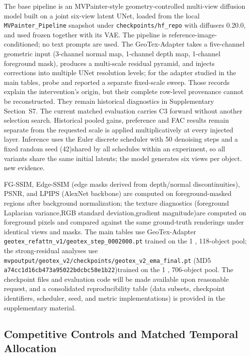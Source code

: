 \documentclass[times,twocolumn,final]{elsarticle}
\providecommand{\DIFadd}[1]{{\protect\color{blue} \sf #1}} %
\providecommand{\DIFdel}[1]{{\protect\color{red} \scriptsize #1}} %
\providecommand{\DIFaddbegin}{} %
\providecommand{\DIFaddend}{} %
\providecommand{\DIFdelbegin}{} %
\providecommand{\DIFdelend}{} %
\begin{document}
\DIFdel{The base pipeline is an MVPainter-style geometry-controlled multi-view diffusion model built on a joint six-view latent UNet, loaded from the local \texttt{MVPainter\_Pipeline} snapshot under \texttt{checkpoints/hf\_repo} with diffusers 0.20.0, and used frozen together with its VAE. The pipeline is reference-image-conditioned; no text prompts are used. The GeoTex-Adapter takes a five-channel geometric input (3-channel normal map, 1-channel depth map, 1-channel foreground mask), produces a multi-scale residual pyramid, and injects corrections into multiple UNet resolution levels; for the adapter studied in the main tables, }\DIFdelend \DIFaddbegin \DIFadd{probe and reported a separate fixed-scale sweep. Those records explain the intervention's origin, but their complete row-level provenance cannot be reconstructed. They remain historical diagnostics in Supplementary Section~S7. The current matched evaluation carries C3 forward without another selection search. Historical pooled gains, preference and FAC results remain separate from }\DIFaddend the \DIFdelbegin \DIFdel{requested scale is applied multiplicatively at every injected layer. Inference uses the Euler discrete scheduler with 50 denoising steps and a fixed random seed (42)shared by all schedules within an experiment, so all variants share the same initial latents; the model generates six views per object.
}\DIFdelend \DIFaddbegin \DIFadd{new evidence.
}\DIFaddend 

\DIFdelbegin \DIFdel{FG-SSIM, Edge-SSIM (edge masks derived from depth/normal discontinuities), PSNR, and LPIPS (AlexNet backbone) are computed on foreground-masked regions after background normalization; the texture diagnostics (foreground Laplacian variance,RGB standard deviation,gradient magnitude)are computed on foreground pixels and compared against the same ground-truth renderings under identical views and masks. The main tables use GeoTex-Adapter \texttt{geotex\_refattn\_v1/geotex\_step\_0002000.pt} trained on the 1}%
\DIFdel{,}%
\DIFdel{118-object pool; the strong-residual analyses use \texttt{mvpoutput/geotex\_v2/checkpoints/geotex\_v2\_ema\_final.pt} (MD5 \texttt{a74cc1d16cb473a95022bdcbc58e1b22})trained on the 1}%
\DIFdel{,}%
\DIFdel{706-object pool. The checkpoint files and evaluation code will be made available upon reasonable request, and a consolidated reproducibility table (data subsets, checkpoint identifiers, scheduler, seed, and metric implementations) is provided in the supplementary material. }\DIFdelend \DIFaddbegin \subsection{Competitive Controls and Matched Temporal Allocation}
\label{subsec:largescale}
\DIFaddend 
\end{document}
